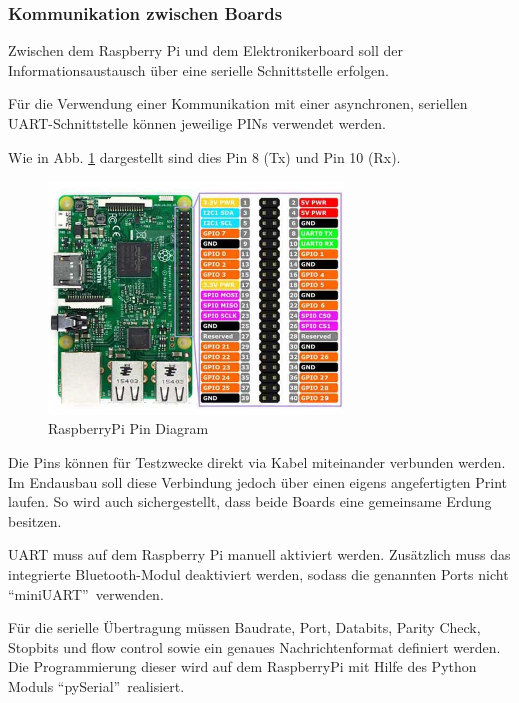 \documentclass[a4paper]{report}
\begin{document}
\newpage

\subsubsection{Kommunikation zwischen Boards}
\label{ssec:kommunikation}
Zwischen dem Raspberry Pi und dem Elektronikerboard soll der Informationsaustausch über eine serielle Schnittstelle erfolgen.

Für die Verwendung einer Kommunikation mit einer asynchronen, seriellen UART-Schnittstelle können jeweilige PINs verwendet werden.

Wie in Abb. \ref{fig:RaspberryPins} dargestellt sind dies Pin 8 (Tx) und Pin 10 (Rx).
\begin{figure}[h!]
	\centering
	\includegraphics[keepaspectratio, width=0.7\textwidth]{raspberry_pi3_model_b_pin_diagram.jpg}
	\caption{RaspberryPi Pin Diagram}
	\label{fig:RaspberryPins}
\end{figure}

Die Pins können für Testzwecke direkt via Kabel miteinander verbunden werden. Im Endausbau soll diese Verbindung jedoch über einen eigens angefertigten Print laufen. So wird auch sichergestellt, dass beide Boards eine gemeinsame Erdung besitzen.

UART muss auf dem Raspberry Pi manuell aktiviert werden.  Zusätzlich muss das integrierte Bluetooth-Modul deaktiviert werden, sodass die genannten Ports nicht \textquotedblleft miniUART\textquotedblright\ verwenden.

Für die serielle Übertragung müssen Baudrate, Port, Databits, Parity Check, Stopbits und flow control sowie ein genaues Nachrichtenformat definiert werden. Die Programmierung dieser wird auf dem RaspberryPi mit Hilfe des Python Moduls \textquotedblleft pySerial\textquotedblright\ realisiert.
\end{document}
